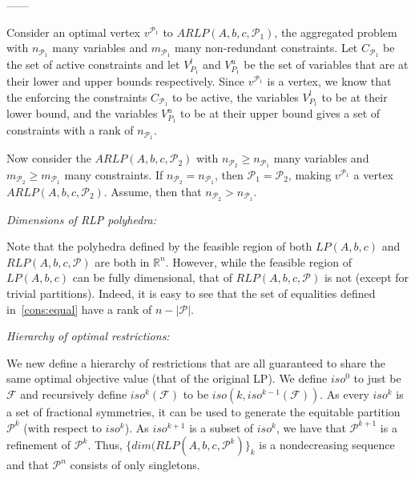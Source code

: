 \documentclass[runningheads]{llncs}
\newcommand{\cP}{{\mathcal P}}
\newcommand{\cF}{{\mathcal F}}
\begin{document}
------



Consider an optimal vertex $v^{\cP_1}$ to $ARLP(A,b,c,\cP_1)$, the aggregated problem with $n_{\cP_1}$ many variables and $m_{\cP_1}$ many non-redundant constraints. Let $C_{\cP_1}$ be the set of active constraints and let $V_{P_1}^l$ and  $V_{P_1}^u$ be the set of variables that are at their lower and upper bounds respectively. Since $v^{\cP_1}$ is a vertex, we know that the enforcing the constraints $C_{\cP_1}$ to be active, the variables $V_{P_1}^l$ to be at their lower bound, and the variables $V_{P_1}^u$ to be at their upper bound gives a set of constraints with a rank of $n_{\cP_1}$.







Now consider the $ARLP(A,b,c,\cP_2)$ with $n_{\cP_2} \geq n_{\cP_1}$ many variables and $m_{\cP_2}\geq m_{\cP_1}$ many constraints. If $n_{\cP_2} = n_{\cP_1}$, then $\cP_1 = \cP_2$, making $v^{\cP_1}$  a vertex $ARLP(A,b,c,\cP_2)$. Assume, then that $n_{\cP_2} > n_{\cP_1}$. 
















{\em Dimensions of RLP polyhedra:}

Note that the polyhedra defined by the feasible region of both $LP(A,b,c)$ and
$RLP(A,b,c,\cP)$ are both in $\mathbb{R}^n$. However, while the feasible
region of $LP(A,b,c)$ can be fully dimensional, that of $RLP(A,b,c,\cP)$ is not
(except for trivial partitions). Indeed, it is easy to see that the set of
equalities defined in~\eqref{cons:equal} have a rank of $n - |\cP|$.

{\em Hierarchy of  optimal restrictions:}

We new define a hierarchy of restrictions that are all guaranteed to share the
same optimal objective value (that of the original LP). We define $iso^0$ to just be $\cF$ and recursively define $iso^k(\cF)$
to be $iso( k , iso^{k-1}(\cF))$. As every $iso^k$ is a set of fractional symmetries, it can be used
to generate the equitable partition $\cP^k$ (with respect to $iso^k$). As $iso^{k+1}$
is a subset of $iso^k$, we have that $\cP^{k+1}$ is a refinement of $\cP^k$.
Thus, $\{dim(RLP(A,b,c,\cP^k)\}_{ k }$ is a nondecreasing
sequence and that $\cP^n$ consists of only singletons.
\end{document}
